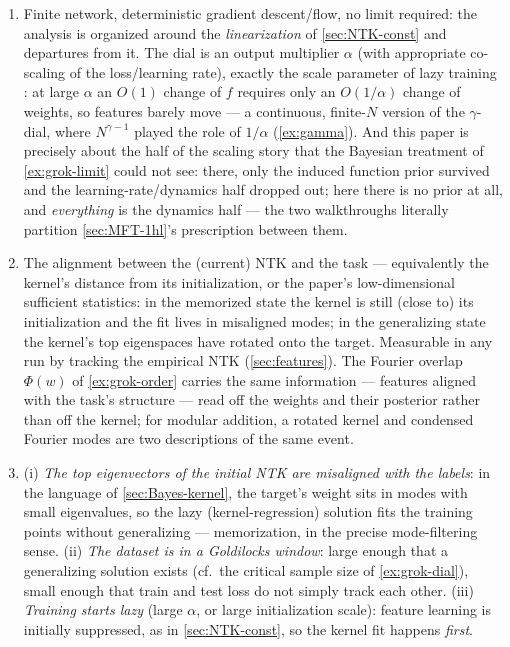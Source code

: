 \documentclass[11pt]{article}
\begin{document}
\begin{solution}
\begin{enumerate}
    \item Finite network, deterministic gradient descent/flow, no limit required: the analysis is organized around the \emph{linearization} of \cref{sec:NTK-const} and departures from it. The dial is an output multiplier $\alpha$ (with appropriate co-scaling of the loss/learning rate), exactly the scale parameter of lazy training \cite{chizat2019lazy}: at large $\alpha$ an $O(1)$ change of $f$ requires only an $O(1/\alpha)$ change of weights, so features barely move --- a continuous, finite-$N$ version of the $\gamma$-dial, where $N^{\gamma - 1}$ played the role of $1/\alpha$ (\cref{ex:gamma}). And this paper is precisely about the half of the scaling story that the Bayesian treatment of \cref{ex:grok-limit} could not see: there, only the induced function prior survived and the learning-rate/dynamics half dropped out; here there is no prior at all, and \emph{everything} is the dynamics half --- the two walkthroughs literally partition \cref{sec:MFT-1hl}'s prescription between them.
    \item The alignment between the (current) NTK and the task --- equivalently the kernel's distance from its initialization, or the paper's low-dimensional sufficient statistics: in the memorized state the kernel is still (close to) its initialization and the fit lives in misaligned modes; in the generalizing state the kernel's top eigenspaces have rotated onto the target. Measurable in any run by tracking the empirical NTK (\cref{sec:features}). The Fourier overlap $\Phi(w)$ of \cref{ex:grok-order} carries the same information --- features aligned with the task's structure --- read off the weights and their posterior rather than off the kernel; for modular addition, a rotated kernel and condensed Fourier modes are two descriptions of the same event.
    \item (i) \emph{The top eigenvectors of the initial NTK are misaligned with the labels}: in the language of \cref{sec:Bayes-kernel}, the target's weight sits in modes with small eigenvalues, so the lazy (kernel-regression) solution fits the training points without generalizing --- memorization, in the precise mode-filtering sense. (ii) \emph{The dataset is in a Goldilocks window}: large enough that a generalizing solution exists (cf.\ the critical sample size of \cref{ex:grok-dial}), small enough that train and test loss do not simply track each other. (iii) \emph{Training starts lazy} (large $\alpha$, or large initialization scale): feature learning is initially suppressed, as in \cref{sec:NTK-const}, so the kernel fit happens \emph{first}.

\end{enumerate}
\end{solution}
\end{document}
